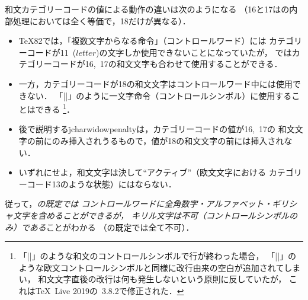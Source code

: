 \documentclass[a4paper,11pt,nomag,dvipdfmx]{jsarticle}
\begin{document}
和文カテゴリーコードの値による動作の違いは次のようになる
（16と17は\pTeX の内部処理においては全く等価で，18だけが異なる）．
\begin{itemize}
  \item \TeX82では，「複数文字からなる命令」（コントロールワード）には
    カテゴリーコードが11~($\mathit{letter}$)の文字しか使用できないことになっていたが，
    \pTeX ではカテゴリーコードが16,~17の和文文字も合わせて使用することができる．
  \item 一方，カテゴリーコードが18の和文文字はコントロールワード中には使用できない．
    「|\】|」のように一文字命令（コントロールシンボル）に使用することはできる
    \footnote{「|\】|」のような和文のコントロールシンボルで行が終わった場合，
    「|\!|」のような欧文コントロールシンボルと同様に改行由来の空白が追加されてしまい，
    和文文字直後の改行は何も発生しないという原則に反していたが，
    これは\TeX~Live 2019の\pTeX~3.8.2で修正された\cite{tjb37}．}．
  \item 後で説明する\.{jcharwidowpenalty}は，カテゴリーコードの値が16,~17の
    和文文字の前にのみ挿入されうるもので，値が18の和文文字の前には挿入されない．
  \item いずれにせよ，和文文字は決して“アクティブ”（欧文文字における
    カテゴリーコード13のような状態）にはならない．
\end{itemize}
従って，\emph{\pTeX の既定では
コントロールワードに全角数字・アルファベット・ギリシャ文字を含めることができるが，
キリル文字は不可（コントロールシンボルのみ）である}ことがわかる
（\upTeX の既定では全て不可）．

\medskip
\end{document}
